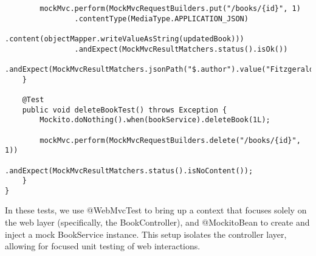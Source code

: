 \begin{lstlisting}
        mockMvc.perform(MockMvcRequestBuilders.put("/books/{id}", 1)
                .contentType(MediaType.APPLICATION_JSON)
                .content(objectMapper.writeValueAsString(updatedBook)))
                .andExpect(MockMvcResultMatchers.status().isOk())
                .andExpect(MockMvcResultMatchers.jsonPath("$.author").value("Fitzgerald"));
    }

    @Test
    public void deleteBookTest() throws Exception {
        Mockito.doNothing().when(bookService).deleteBook(1L);

        mockMvc.perform(MockMvcRequestBuilders.delete("/books/{id}", 1))
                .andExpect(MockMvcResultMatchers.status().isNoContent());
    }
}

\end{lstlisting}

In these tests, we use @WebMvcTest to bring up a context that focuses solely on the web layer (specifically, the BookController), and @MockitoBean to create and inject a mock BookService instance. This setup isolates the controller layer, allowing for focused unit testing of web interactions.


